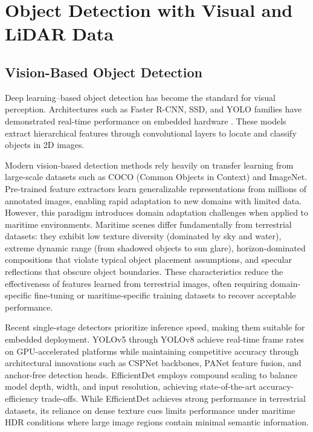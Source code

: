 \documentclass{erauthesis}
\begin{document}

\section{Object Detection with Visual and LiDAR Data}

\subsection{Vision-Based Object Detection}

Deep learning–based object detection has become the standard for visual perception. Architectures such as Faster R-CNN, SSD, and YOLO families have demonstrated real-time performance on embedded hardware \cite{he2016, ultralytics}. These models extract hierarchical features through convolutional layers to locate and classify objects in 2D images.

Modern vision-based detection methods rely heavily on transfer learning from large-scale datasets such as COCO (Common Objects in Context) and ImageNet. Pre-trained feature extractors learn generalizable representations from millions of annotated images, enabling rapid adaptation to new domains with limited data. However, this paradigm introduces domain adaptation challenges when applied to maritime environments. Maritime scenes differ fundamentally from terrestrial datasets: they exhibit low texture diversity (dominated by sky and water), extreme dynamic range (from shadowed objects to sun glare), horizon-dominated compositions that violate typical object placement assumptions, and specular reflections that obscure object boundaries. These characteristics reduce the effectiveness of features learned from terrestrial images, often requiring domain-specific fine-tuning or maritime-specific training datasets to recover acceptable performance.

Recent single-stage detectors prioritize inference speed, making them suitable for embedded deployment. YOLOv5 through YOLOv8 \cite{ultralytics} achieve real-time frame rates on GPU-accelerated platforms while maintaining competitive accuracy through architectural innovations such as CSPNet backbones, PANet feature fusion, and anchor-free detection heads. EfficientDet \cite{tan2020} employs compound scaling to balance model depth, width, and input resolution, achieving state-of-the-art accuracy-efficiency trade-offs. While EfficientDet achieves strong performance in terrestrial datasets, its reliance on dense texture cues limits performance under maritime HDR conditions where large image regions contain minimal semantic information.
\end{document}
